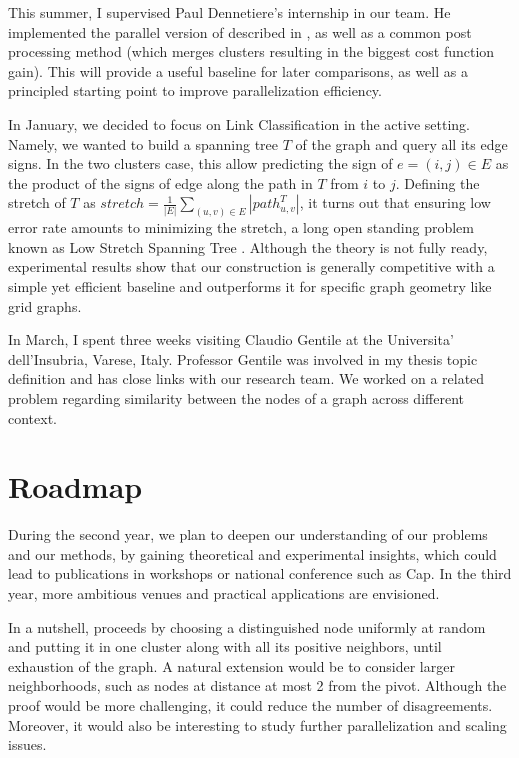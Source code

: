 This summer, I supervised Paul Dennetiere's internship in our team. He
implemented the parallel version of \kwik{} described in \autocite{Pan2014}, as
well as a common post processing method (which merges clusters resulting in the
biggest cost function gain). This will provide a useful baseline for later
comparisons, as well as a principled starting point to improve parallelization
efficiency.

\medskip

In January, we decided to focus on Link Classification in the active setting.
Namely, we wanted to build a spanning tree $T$ of the graph and query all its
edge signs. In the two clusters case, this allow predicting the sign of $e=(i,
j) \in E$ as the product of the signs of edge along the path in $T$ from $i$ to
$j$. Defining the stretch of $T$ as $stretch = \frac{1}{|E|} \sum_{(u,v) \in E}
|path^T_{u,v}|$, it turns out that ensuring low error rate amounts to
minimizing the stretch, a long open standing problem known as Low Stretch
Spanning Tree \autocite{Abraham2012}. Although the theory is not fully ready,
experimental results show that our construction is generally competitive with a
simple yet efficient baseline and outperforms it for specific graph geometry
like grid graphs.

In March, I spent three weeks visiting Claudio Gentile at the Universita'
dell'Insubria, Varese, Italy. Professor Gentile was involved in my thesis topic
definition and has close links with our research team. We worked on a related
problem regarding similarity between the nodes of a graph across different
context.

\section{Roadmap}\label{roadmap}

During the second year, we plan to deepen our understanding of our problems and
our methods, by gaining theoretical and experimental insights, which could lead
to publications in workshops or national conference such as Cap. In the third
year, more ambitious venues and practical applications are envisioned.


In a nutshell, \kwik{} proceeds by choosing a distinguished node uniformly at
random and putting it in one cluster along with all its positive neighbors,
until exhaustion of the graph. A natural extension would be to consider larger
neighborhoods, such as nodes at distance at most 2 from the pivot. Although the
proof would be more challenging, it could reduce the number of disagreements.
Moreover, it would also be interesting to study further parallelization and
scaling issues.

